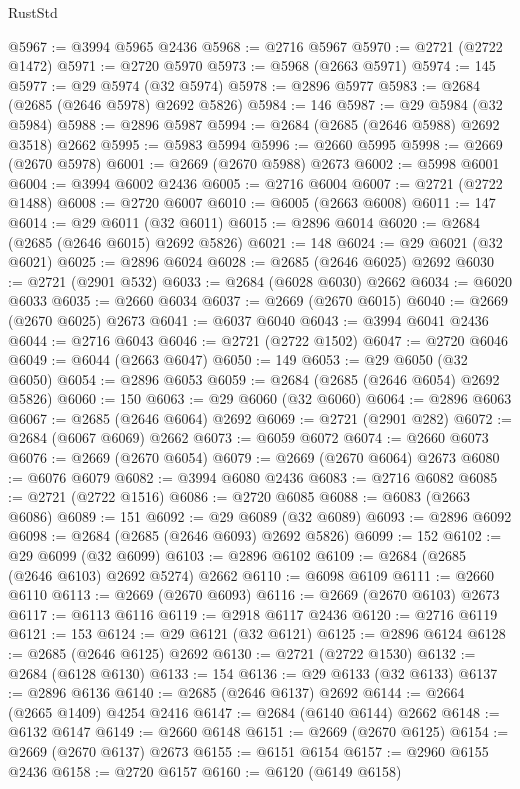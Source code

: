 \begin{lexlean}{RustStd}
\begin{coremodule}
@5967 := @3994 @5965 @2436
@5968 := @2716 @5967
@5970 := @2721 (@2722 @1472)
@5971 := @2720 @5970
@5973 := @5968 (@2663 @5971)
@5974 := 145
@5977 := @29 @5974 (@32 @5974)
@5978 := @2896 @5977
@5983 := @2684 (@2685 (@2646 @5978) @2692 @5826)
@5984 := 146
@5987 := @29 @5984 (@32 @5984)
@5988 := @2896 @5987
@5994 := @2684 (@2685 (@2646 @5988) @2692 @3518) @2662
@5995 := @5983 @5994
@5996 := @2660 @5995
@5998 := @2669 (@2670 @5978)
@6001 := @2669 (@2670 @5988) @2673
@6002 := @5998 @6001
@6004 := @3994 @6002 @2436
@6005 := @2716 @6004
@6007 := @2721 (@2722 @1488)
@6008 := @2720 @6007
@6010 := @6005 (@2663 @6008)
@6011 := 147
@6014 := @29 @6011 (@32 @6011)
@6015 := @2896 @6014
@6020 := @2684 (@2685 (@2646 @6015) @2692 @5826)
@6021 := 148
@6024 := @29 @6021 (@32 @6021)
@6025 := @2896 @6024
@6028 := @2685 (@2646 @6025) @2692
@6030 := @2721 (@2901 @532)
@6033 := @2684 (@6028 @6030) @2662
@6034 := @6020 @6033
@6035 := @2660 @6034
@6037 := @2669 (@2670 @6015)
@6040 := @2669 (@2670 @6025) @2673
@6041 := @6037 @6040
@6043 := @3994 @6041 @2436
@6044 := @2716 @6043
@6046 := @2721 (@2722 @1502)
@6047 := @2720 @6046
@6049 := @6044 (@2663 @6047)
@6050 := 149
@6053 := @29 @6050 (@32 @6050)
@6054 := @2896 @6053
@6059 := @2684 (@2685 (@2646 @6054) @2692 @5826)
@6060 := 150
@6063 := @29 @6060 (@32 @6060)
@6064 := @2896 @6063
@6067 := @2685 (@2646 @6064) @2692
@6069 := @2721 (@2901 @282)
@6072 := @2684 (@6067 @6069) @2662
@6073 := @6059 @6072
@6074 := @2660 @6073
@6076 := @2669 (@2670 @6054)
@6079 := @2669 (@2670 @6064) @2673
@6080 := @6076 @6079
@6082 := @3994 @6080 @2436
@6083 := @2716 @6082
@6085 := @2721 (@2722 @1516)
@6086 := @2720 @6085
@6088 := @6083 (@2663 @6086)
@6089 := 151
@6092 := @29 @6089 (@32 @6089)
@6093 := @2896 @6092
@6098 := @2684 (@2685 (@2646 @6093) @2692 @5826)
@6099 := 152
@6102 := @29 @6099 (@32 @6099)
@6103 := @2896 @6102
@6109 := @2684 (@2685 (@2646 @6103) @2692 @5274) @2662
@6110 := @6098 @6109
@6111 := @2660 @6110
@6113 := @2669 (@2670 @6093)
@6116 := @2669 (@2670 @6103) @2673
@6117 := @6113 @6116
@6119 := @2918 @6117 @2436
@6120 := @2716 @6119
@6121 := 153
@6124 := @29 @6121 (@32 @6121)
@6125 := @2896 @6124
@6128 := @2685 (@2646 @6125) @2692
@6130 := @2721 (@2722 @1530)
@6132 := @2684 (@6128 @6130)
@6133 := 154
@6136 := @29 @6133 (@32 @6133)
@6137 := @2896 @6136
@6140 := @2685 (@2646 @6137) @2692
@6144 := @2664 (@2665 @1409) @4254 @2416
@6147 := @2684 (@6140 @6144) @2662
@6148 := @6132 @6147
@6149 := @2660 @6148
@6151 := @2669 (@2670 @6125)
@6154 := @2669 (@2670 @6137) @2673
@6155 := @6151 @6154
@6157 := @2960 @6155 @2436
@6158 := @2720 @6157
@6160 := @6120 (@6149 @6158)

\end{coremodule}
\end{lexlean}
